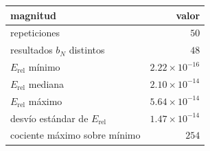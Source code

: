 \begin{tabular}{lr}
\toprule
magnitud & valor \\
\midrule
repeticiones & $50$ \\
resultados $b_N$ distintos & $48$ \\
$E_\mathrm{rel}$ mínimo & $2.22 \times 10^{-16}$ \\
$E_\mathrm{rel}$ mediana & $2.10 \times 10^{-14}$ \\
$E_\mathrm{rel}$ máximo & $5.64 \times 10^{-14}$ \\
desvío estándar de $E_\mathrm{rel}$ & $1.47 \times 10^{-14}$ \\
cociente máximo sobre mínimo & $254$ \\
\bottomrule
\end{tabular}
